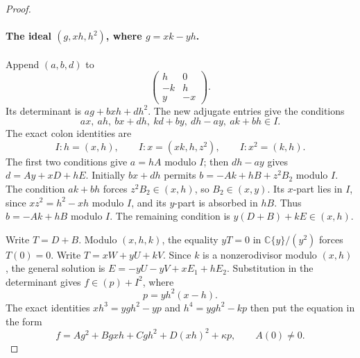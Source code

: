 \begin{proof}
\paragraph{The ideal $(g,xh,h^2)$, where $g=xk-yh$.}
Append $(a,b,d)$ to
\[
                         \begin{pmatrix}h&0\\-k&h\\y&-x\end{pmatrix}.
\]
Its determinant is $ag+bxh+dh^2$. The new adjugate
entries give the conditions
\[
       ax,\ ah,\ bx+dh,\ kd+by,\ dh-ay,\ ak+bh\in I.
\]
The exact colon identities are
\[
 I:h=(x,h),\qquad I:x=(xk,h,z^2),\qquad I:x^2=(k,h).
\]
The first two conditions give $a=hA$ modulo $I$;
then $dh-ay$ gives $d=Ay+xD+hE$.
Initially $bx+dh$ permits
$b=-Ak+hB+z^2B_2$ modulo $I$.
The condition $ak+bh$ forces $z^2B_2\in(x,h)$,
so $B_2\in(x,y)$. Its $x$-part lies in $I$, since
$xz^2=h^2-xh$ modulo $I$, and its $y$-part is
absorbed in $hB$. Thus $b=-Ak+hB$ modulo $I$.
The remaining condition is $y(D+B)+kE\in(x,h)$.

Write $T=D+B$. Modulo $(x,h,k)$, the equality
$yT=0$ in $\mathbb C\{y\}/(y^2)$ forces $T(0)=0$.
Write $T=xW+yU+kV$. Since $k$ is a nonzerodivisor
modulo $(x,h)$, the general solution is
$E=-yU-yV+xE_1+hE_2$. Substitution in the determinant
gives $f\in(p)+I^2$, where
\[
                            p=yh^2(x-h).
\]
The exact identities
$xh^3=ygh^2-yp$ and $h^4=ygh^2-kp$ then put the
equation in the form
\[
 f=A g^2+B gxh+Cgh^2+D(xh)^2+\kappa p,
                       \qquad A(0)\ne0.              \tag{4.49b}
\]


\end{proof}
